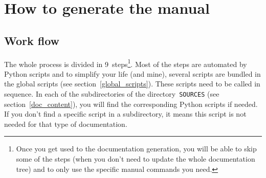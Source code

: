 \documentclass[a4paper,10pt]{article}
\newcommand{\code}[1]{\texttt{#1}}
\begin{document}
\section{How to generate the manual}


\subsection{Work flow}
\label{work_flow}

The whole process is divided in 9~steps\footnote{Once you get used to the documentation generation, you will be able to skip some of the steps (when you don't need to update the whole documentation tree) and to only use the specific manual commands you need.}. Most of the steps are automated by Python scripts and to simplify your life (and mine), several scripts are bundled in the global scripts (see section~\ref{global_scripts}). These scripts need to be called in sequence. In each of the subdirectories of the directory~\code{SOURCES} (see section~\ref{doc_content}), you will find the corresponding Python scripts if needed. If you don't 
find a specific script in a subdirectory, it means this script is not needed for that type of documentation.\\
\end{document}

